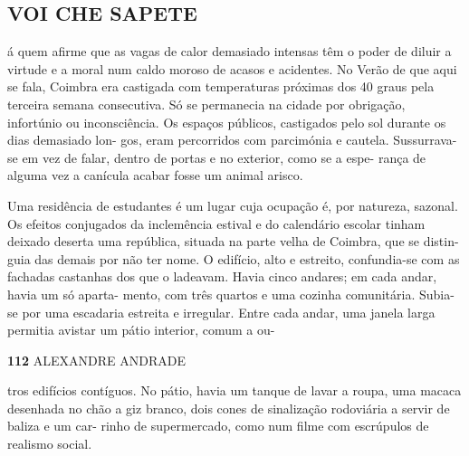 \subsection{VOI CHE SAPETE}

á quem afirme que as vagas de calor demasiado intensas têm o poder de
diluir a virtude e a moral num caldo moroso de acasos e acidentes. No
Verão de que aqui se fala, Coimbra era castigada com temperaturas
próximas dos 40 graus pela terceira semana consecutiva. Só se permanecia
na cidade por obrigação, infortúnio ou inconsciência. Os espaços
públicos, castigados pelo sol durante os dias demasiado lon- gos, eram
percorridos com parcimónia e cautela. Sussurrava-se em vez de falar,
dentro de portas e no exterior, como se a espe- rança de alguma vez a
canícula acabar fosse um animal arisco.

Uma residência de estudantes é um lugar cuja ocupação é, por natureza,
sazonal. Os efeitos conjugados da inclemência estival e do calendário
escolar tinham deixado deserta uma república, situada na parte velha de
Coimbra, que se distin- guia das demais por não ter nome. O edifício,
alto e estreito, confundia-se com as fachadas castanhas dos que o
ladeavam. Havia cinco andares; em cada andar, havia um só aparta- mento,
com três quartos e uma cozinha comunitária. Subia-se por uma escadaria
estreita e irregular. Entre cada andar, uma janela larga permitia
avistar um pátio interior, comum a ou-

\textbf{112 }ALEXANDRE ANDRADE

tros edifícios contíguos. No pátio, havia um tanque de lavar a roupa,
uma macaca desenhada no chão a giz branco, dois cones de sinalização
rodoviária a servir de baliza e um car- rinho de supermercado, como num
filme com escrúpulos de realismo social.

